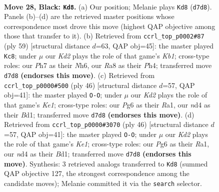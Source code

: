 \documentclass[11pt]{article}
\begin{document}
\clearpage

\begin{figure}[p]\centering
\begin{subfigure}{0.46\textwidth}\centering
\resizebox{\linewidth}{!}{%
\newchessgame
\chessboard[
  setfen={rn3r2/1p1kbb1p/6pP/p2pPp2/P2N4/6P1/6K1/RNB2R2 b - - 0 28},
  showmover=false,
  pgfstyle=straightmove, color=movearrow, markmove={d7-d8}
]}
\caption{}
\end{subfigure}\hfill
\begin{subfigure}{0.46\textwidth}\centering
\resizebox{\linewidth}{!}{%
\newchessgame
\chessboard[
  setfen={1k2rr2/2p5/p1p4n/1p2Ppb1/7p/7P/PPP3PB/3NRR1K b - - 1 30},
  showmover=false,
  pgfstyle=straightmove, color=movearrow, markmove={b8-c8}
]}
\caption{}
\end{subfigure}
\\[4pt]
\begin{subfigure}{0.46\textwidth}\centering
\resizebox{\linewidth}{!}{%
\newchessgame
\chessboard[
  setfen={r3k2r/1b3p2/1p6/4p1Pp/3nP2P/8/PP6/R1BBK2R w KQkq - 1 24},
  showmover=false,
  pgfstyle=straightmove, color=movearrow, markmove={e1-g1}
]}
\caption{}
\end{subfigure}\hfill
\begin{subfigure}{0.46\textwidth}\centering
\resizebox{\linewidth}{!}{%
\newchessgame
\chessboard[
  setfen={r3k2r/1b3p2/1p6/4p1Pp/3nP2P/8/PP6/R1BBK2R w KQkq - 1 24},
  showmover=false,
  pgfstyle=straightmove, color=movearrow, markmove={e1-g1}
]}
\caption{}
\end{subfigure}
\caption{\textbf{Move 28, Black: \texttt{Kd8}.} (a) Our position; Melanie plays \texttt{Kd8} (\texttt{d7d8}). Panels (b)--(d) are the retrieved master positions whose correspondence most drove this move (highest QAP objective among those that transfer to it). (b) Retrieved from \texttt{ccrl\_top\_p0002\#87} (ply 59) [structural distance $d$=63, QAP obj=45]: the master played \texttt{Kc8}; under $\mu$ our \emph{Kd2} plays the role of that game's \emph{Kb1}; cross-type roles: our \emph{P}h7 as their \emph{N}h6, our \emph{R}a8 as their \emph{P}h4; transferred move \texttt{d7d8} \textbf{(endorses this move)}. (c) Retrieved from \texttt{ccrl\_top\_p0000\#500} (ply 46) [structural distance $d$=57, QAP obj=41]: the master played \texttt{O-O}; under $\mu$ our \emph{Kd2} plays the role of that game's \emph{Ke1}; cross-type roles: our \emph{P}g6 as their \emph{R}a1, our \emph{n}d4 as their \emph{B}d1; transferred move \texttt{d7d8} \textbf{(endorses this move)}. (d) Retrieved from \texttt{ccrl\_top\_p0000\#3070} (ply 46) [structural distance $d$=57, QAP obj=41]: the master played \texttt{O-O}; under $\mu$ our \emph{Kd2} plays the role of that game's \emph{Ke1}; cross-type roles: our \emph{P}g6 as their \emph{R}a1, our \emph{n}d4 as their \emph{B}d1; transferred move \texttt{d7d8} \textbf{(endorses this move)}. Synthesis: 3 retrieved analogs transferred to \texttt{Kd8} (summed QAP objective 127, the strongest correspondence among the candidate moves); Melanie committed it via the \texttt{search} selector.}
\label{fig:thought-m55}
\end{figure}
\end{document}
